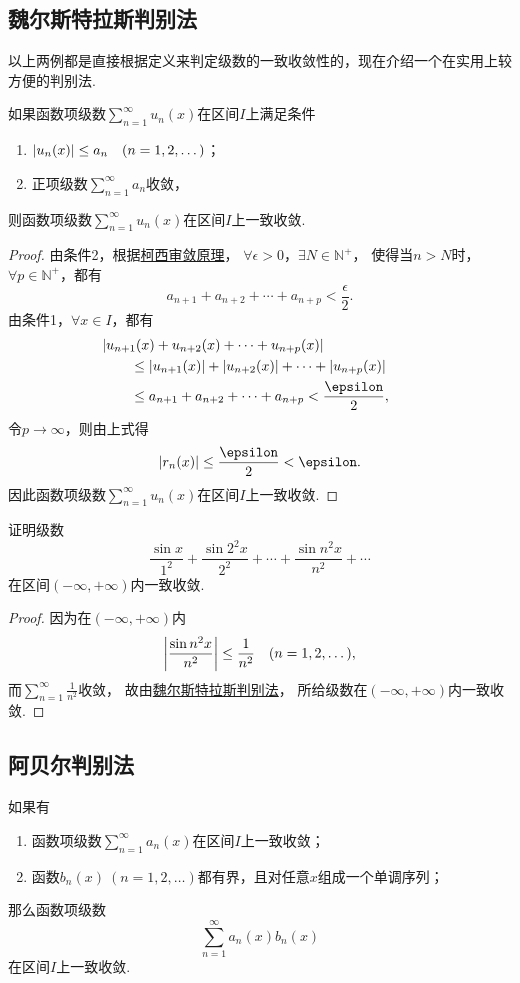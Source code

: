 \subsection{魏尔斯特拉斯判别法}
以上两例都是直接根据定义来判定级数的一致收敛性的，现在介绍一个在实用上较方便的判别法.
\begin{theorem}[魏尔斯特拉斯判别法]\label{theorem:无穷级数.魏尔斯特拉斯判别法}
如果函数项级数\(\sum_{n=1}^\infty u_n(x)\)在区间\(I\)上满足条件\begin{enumerate}
\item \(\abs{u_n(x)} \leq a_n \quad(n=1,2,\dotsc)\)；
\item 正项级数\(\sum_{n=1}^\infty a_n\)收敛，
\end{enumerate}
则函数项级数\(\sum_{n=1}^\infty u_n(x)\)在区间\(I\)上一致收敛.
\begin{proof}
由条件2，根据\hyperref[theorem:无穷级数.级数的柯西审敛原理]{柯西审敛原理}，
\(\forall\epsilon>0\)，\(\exists N \in \mathbb{N}^+\)，
使得当\(n > N\)时，\(\forall p \in \mathbb{N}^+\)，都有\[
a_{n+1} + a_{n+2} + \dotsb + a_{n+p} < \frac{\epsilon}{2}.
\]由条件1，\(\forall x \in I\)，都有\begin{align*}
&\hspace{-20pt}\abs{u_{n+1}(x) + u_{n+2}(x) + \dotsb + u_{n+p}(x)} \\
&\leq \abs{u_{n+1}(x)} + \abs{u_{n+2}(x)} + \dotsb + \abs{u_{n+p}(x)} \\
&\leq a_{n+1} + a_{n+2} + \dotsb + a_{n+p} < \frac{\epsilon}{2},
\end{align*}令\(p\to\infty\)，则由上式得\[
\abs{r_n(x)} \leq \frac{\epsilon}{2} < \epsilon.
\]因此函数项级数\(\sum_{n=1}^\infty u_n(x)\)在区间\(I\)上一致收敛.
\end{proof}
\end{theorem}

\begin{example}
证明级数\[
\frac{\sin x}{1^2}
+ \frac{\sin 2^2 x}{2^2}
+ \dotsb
+ \frac{\sin n^2 x}{n^2}
+ \dotsb
\]在区间\((-\infty,+\infty)\)内一致收敛.
\begin{proof}
因为在\((-\infty,+\infty)\)内\[
\abs{\frac{\sin n^2 x}{n^2}} \leq \frac{1}{n^2}
\quad(n=1,2,\dotsc),
\]而\(\sum_{n=1}^\infty \frac{1}{n^2}\)收敛，
故由\hyperref[theorem:无穷级数.魏尔斯特拉斯判别法]{魏尔斯特拉斯判别法}，
所给级数在\((-\infty,+\infty)\)内一致收敛.
\end{proof}
\end{example}

\subsection{阿贝尔判别法}
\begin{theorem}[阿贝尔判别法]\label{theorem:无穷级数.阿贝尔判别法}
如果有
\begin{enumerate}
\item 函数项级数\(\sum_{n=1}^\infty a_n(x)\)在区间\(I\)上一致收敛；
\item 函数\(b_n(x)\ (n=1,2,\dotsc)\)都有界，且对任意\(x\)组成一个单调序列；
\end{enumerate}
那么函数项级数\[
	\sum_{n=1}^\infty a_n(x) b_n(x)
\]
在区间\(I\)上一致收敛.
\end{theorem}

